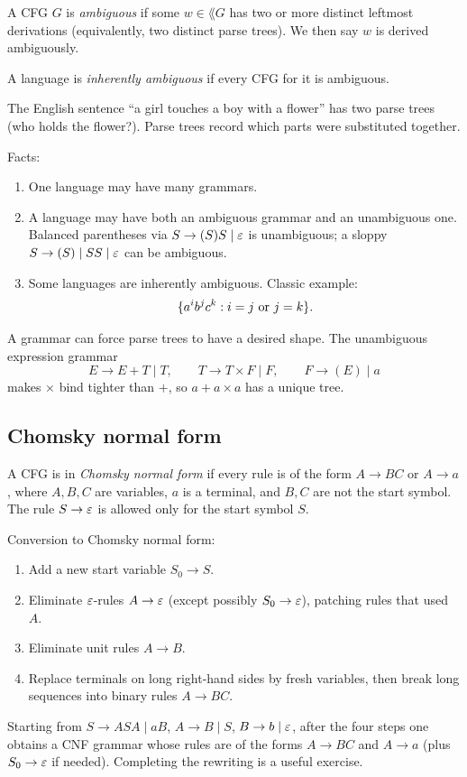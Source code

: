 \begin{definition}
A CFG $G$ is \emph{ambiguous} if some $w\in\lang{G}$ has two or more distinct
leftmost derivations (equivalently, two distinct parse trees). We then say
$w$ is derived ambiguously.

A language is \emph{inherently ambiguous} if every CFG for it is ambiguous.
\end{definition}

The English sentence ``a girl touches a boy with a flower'' has two
parse trees (who holds the flower?). Parse trees record which parts were
substituted together.

Facts:
\begin{enumerate}
  \item One language may have many grammars.
  \item A language may have both an ambiguous grammar and an unambiguous one.
        Balanced parentheses via $S\to(S)S\mid\varepsilon$ is unambiguous; a sloppy
        $S\to(S)\mid SS\mid\varepsilon$ can be ambiguous.
  \item Some languages are inherently ambiguous. Classic example:
        \[
          \{a^ib^jc^k:i=j\text{ or }j=k\}.
        \]
\end{enumerate}

A grammar can force parse trees to have a desired shape. The unambiguous
expression grammar
\[
  E\to E+T\mid T,\qquad
  T\to T\times F\mid F,\qquad
  F\to(E)\mid a
\]
makes $\times$ bind tighter than $+$, so $a+a\times a$ has a unique tree.

\subsection{Chomsky normal form}
\begin{definition}
A CFG is in \emph{Chomsky normal form} if every rule is of the form
$A\to BC$ or $A\to a$, where $A,B,C$ are variables, $a$ is a terminal, and
$B,C$ are not the start symbol. The rule $S\to\varepsilon$ is allowed only for the
start symbol $S$.
\end{definition}

Conversion to Chomsky normal form:
\begin{enumerate}
  \item Add a new start variable $S_0\to S$.
  \item Eliminate $\varepsilon$-rules $A\to\varepsilon$ (except possibly $S_0\to\varepsilon$),
        patching rules that used $A$.
  \item Eliminate unit rules $A\to B$.
  \item Replace terminals on long right-hand sides by fresh variables, then
        break long sequences into binary rules $A\to BC$.
\end{enumerate}

\begin{example}
Starting from $S\to ASA\mid aB$, $A\to B\mid S$, $B\to b\mid\varepsilon$, after
the four steps one obtains a CNF grammar whose rules are of the forms
$A\to BC$ and $A\to a$ (plus $S_0\to\varepsilon$ if needed). Completing the
rewriting is a useful exercise.
\end{example}

